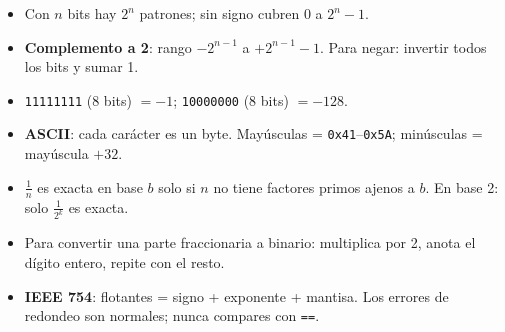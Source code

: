 \documentclass[12pt, oneside]{article}
\begin{document}
\begin{recuerda}
\begin{itemize}
  \item Con $n$ bits hay $2^n$ patrones; sin signo cubren 0 a $2^n-1$.
  \item \textbf{Complemento a 2}: rango $-2^{n-1}$ a $+2^{n-1}-1$.
        Para negar: invertir todos los bits y sumar 1.
  \item \texttt{11111111} (8 bits) $= -1$; \quad
        \texttt{10000000} (8 bits) $= -128$.
  \item \textbf{ASCII}: cada carácter es un byte.
        Mayúsculas = \texttt{0x41}–\texttt{0x5A};
        minúsculas = mayúscula $+ 32$.
  \item $\frac{1}{n}$ es exacta en base $b$ solo si $n$ no tiene factores
        primos ajenos a $b$. En base 2: solo $\frac{1}{2^k}$ es exacta.
  \item Para convertir una parte fraccionaria a binario: multiplica por 2,
        anota el dígito entero, repite con el resto.
  \item \textbf{IEEE 754}: flotantes = signo + exponente + mantisa.
        Los errores de redondeo son normales; nunca compares con \texttt{==}.
\end{itemize}
\end{recuerda}
\end{document}
